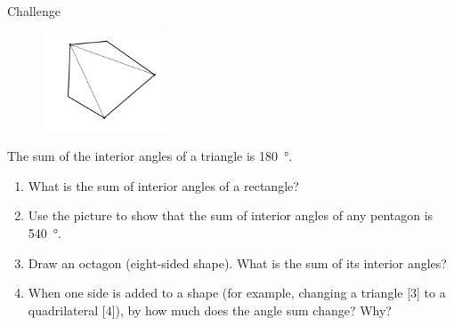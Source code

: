 \documentclass[14pt,letterpaper]{article}
\begin{document}
\begin{problem}{Challenge}

\begin{figure}
 \includegraphics[width=10em]{pentagon.png}
\end{figure}

The sum of the interior angles of a triangle is \SI{180}{\degree}.

\begin{enumerate}
 \item What is the sum of interior angles of a rectangle?
 \item Use the picture to show that the sum of interior angles of any pentagon
 is \SI{540}{\degree}.
 \item Draw an octagon (eight-sided shape). What is the sum of its interior
 angles?
 \item When one side is added to a shape (for example, changing a triangle [$3$]
 to a quadrilateral [$4$]), by how much does the angle sum change? Why?
\end{enumerate}

\end{problem}
\end{document}

